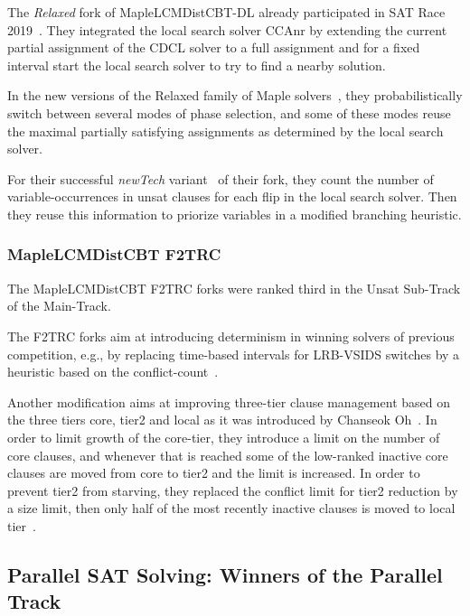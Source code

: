 \documentclass{elsarticle}
\begin{document}
The \emph{Relaxed} fork of MapleLCMDistCBT-DL already participated in SAT Race 2019~\cite{Xindi:SC2019}.
They integrated the local search solver CCAnr by extending the current partial assignment of the CDCL solver to a full assignment and for a fixed interval start the local search solver to try to find a nearby solution. 

In the new versions of the Relaxed family of Maple solvers~\cite{Xindi:SC2020}, they probabilistically switch between several modes of phase selection, and some of these modes reuse the maximal partially satisfying assignments as determined by the local search solver.

For their successful \emph{newTech} variant~\cite{Xindi:SC2020} of their fork, they count the number of variable-occurrences in unsat clauses for each flip in the local search solver. 
Then they reuse this information to priorize variables in a modified branching heuristic. 


\subsubsection{MapleLCMDistCBT F2TRC}

The MapleLCMDistCBT F2TRC forks were ranked third in the Unsat Sub-Track of the Main-Track.

The F2TRC forks aim at introducing determinism in winning solvers of previous competition, e.g., by replacing time-based intervals for LRB-VSIDS switches by a heuristic based on the conflict-count~\cite{Kochemazov:SC2020}. 

Another modification aims at improving three-tier clause management based on the three tiers core, tier2 and local as it was introduced by Chanseok Oh~\cite{Oh:2015:satunsat}.
In order to limit growth of the core-tier, they introduce a limit on the number of core clauses, and whenever that is reached some of the low-ranked inactive core clauses are moved from core to tier2 and the limit is increased. 
In order to prevent tier2 from starving, they replaced the conflict limit for tier2 reduction by a size limit, then only half of the most recently inactive clauses is moved to local tier~\cite{Kochemazov:SC2020}. 


\subsection{Parallel SAT Solving: Winners of the Parallel Track}
\label{sec:part:par}
\end{document}
